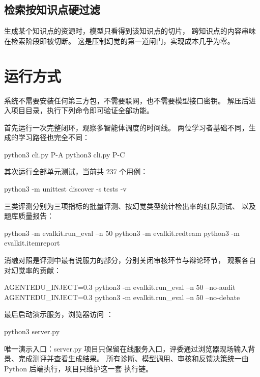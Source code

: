 \subsection{检索按知识点硬过滤}

生成某个知识点的资源时，模型只看得到该知识点的切片，
跨知识点的内容串味在检索阶段即被切断。
这是压制幻觉的第一道闸门，实现成本几乎为零。

\section{运行方式}

系统不需要安装任何第三方包，不需要联网，也不需要模型接口密钥。
解压后进入项目目录，执行下列命令即可验证全部功能。

首先运行一次完整闭环，观察多智能体调度的时间线。
两位学习者基础不同，生成的学习路径也完全不同：

\begin{code}
python3 cli.py P-A
python3 cli.py P-C
\end{code}

其次运行全部单元测试，当前共 237 个用例：

\begin{code}
python3 -m unittest discover -s tests -v
\end{code}

三类评测分别为三项指标的批量评测、按幻觉类型统计检出率的红队测试、
以及题库质量报告：

\begin{code}
python3 -m evalkit.run_eval --n 50
python3 -m evalkit.redteam
python3 -m evalkit.itemreport
\end{code}

消融对照是评测中最有说服力的部分，分别关闭审核环节与辩论环节，
观察各自对幻觉率的贡献：

\begin{code}
AGENTEDU_INJECT=0.3 python3 -m evalkit.run_eval --n 50 --no-audit
AGENTEDU_INJECT=0.3 python3 -m evalkit.run_eval --n 50 --no-debate
\end{code}

最后启动演示服务，浏览器访问 ：

\begin{code}
python3 server.py
\end{code}

\begin{keynote}{唯一演示入口：server.py}
项目只保留在线服务入口，评委通过浏览器现场输入背景、完成测评并查看生成结果。
所有诊断、模型调用、审核和反馈决策统一由 Python 后端执行，项目只维护这一套
执行链。
\end{keynote}




